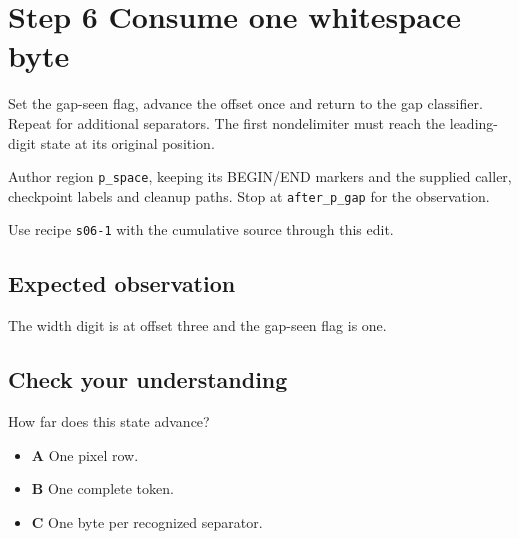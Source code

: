 \section{Step 6 Consume one whitespace byte}\label{ppm-s06}

Set the gap-seen flag, advance the offset once and return to the gap classifier. Repeat for additional separators. The first nondelimiter must reach the leading-digit state at its original position.

Author region \texttt{p\_space}, keeping its BEGIN/END markers and the supplied caller, checkpoint labels and cleanup paths. Stop at \texttt{after\_p\_gap} for the observation.

Use recipe \texttt{s06-1} with the cumulative source through this edit.

\subsection{Expected observation}
The width digit is at offset three and the gap-seen flag is one.

\subsection{Check your understanding}
How far does this state advance?

\begin{itemize}
\item \textbf{A} One pixel row.
\item \textbf{B} One complete token.
\item \textbf{C} One byte per recognized separator.
\end{itemize}
